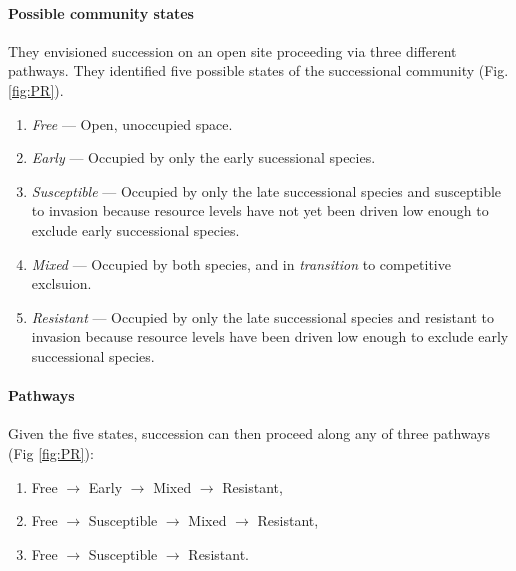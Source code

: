 \paragraph{Possible community states} 
They envisioned succession on an open site proceeding via three different pathways. They identified five possible states of the successional community (Fig. \ref{fig:PR}).
\begin{enumerate}
\item \emph{Free} --- Open, unoccupied space.
\item \emph{Early} --- Occupied by only the early sucessional species.
\item {}\emph{Susceptible} --- Occupied by only the late successional species and susceptible to invasion because resource levels have not yet been driven low enough to exclude early successional species.
\item \emph{Mixed} --- Occupied by both species, and in \emph{transition} to competitive exclsuion.
\item  {}\emph{Resistant} --- Occupied by only the late successional species and resistant to invasion because resource levels have been driven low enough to exclude early successional species.
\end{enumerate}

\paragraph{Pathways}
Given the five states, succession can then proceed along any of three pathways (Fig \ref{fig:PR}):
\begin{enumerate}
\item Free $\rightarrow$ Early $\rightarrow$ Mixed $\rightarrow$ Resistant,
\item Free $\rightarrow$ Susceptible $\rightarrow$ Mixed $\rightarrow$ Resistant,
\item Free $\rightarrow$ Susceptible $\rightarrow$ Resistant.
\end{enumerate}

